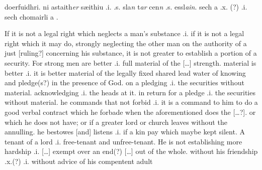 \documentclass[11pt]{article}
\begin{document}
\begin{pages}
\begin{Leftside}
doerfuidhri.  ni astaith\emph{er} sæithiu .i. .s. sla\emph{n} t\emph{ar} cen\emph{n} .s. essl\emph{ain}.  sech a  .x. (?) .i. sech chomairli a .
    
    \pend
  \endnumbering
  \end{Leftside}

\begin{Rightside}
    \beginnumbering\pstart
    If it is not a legal right which neglects a man's substance .i. if it is not a legal right which it may do, strongly neglecting the other man on the authority of a just [ruling?] concerning his substance, it is not greater to establish a portion of a security.  For strong men are better .i. full material of the [\ldots] strength. material is better .i. it is better material of the legally fixed shared lead water of knowing and pledge(s?) in the presence of God.  on a pledging .i. the securities without material. acknowledging .i. the heads at it.  in return for a pledge .i. the securities without material.  he commands that not forbid .i. it is a command to him to do a good verbal contract which he forbade when the aforementioned does the [\ldots?].  or which he does not have; or if a greater lord or church leaves without the annulling.  he bestowes [and] listens .i. if a kin pay which maybe kept silent.  A tenant of a lord .i. free-tenant and unfree-tenant. He is not establishing more hardship .i. [\ldots] exempt over an end(?) [\ldots] out of the whole.  without his friendship .x.(?) .i. without advice of his compentent adult 
    \pend
    \endnumbering
  \end{Rightside}

  \Pages
\end{pages}
\end{document}
